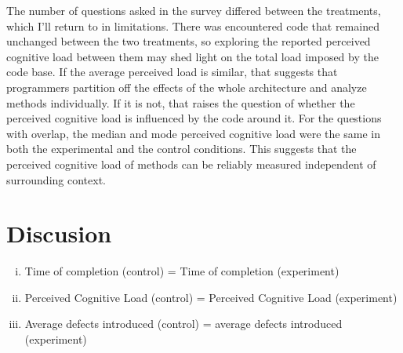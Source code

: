 The number of questions asked in the survey differed between the treatments, which I’ll return to in limitations. There was encountered code that remained unchanged between the two treatments, so exploring the reported perceived cognitive load between them may shed light on the total load imposed by the code base. If the average perceived load is similar, that suggests that programmers partition off the effects of the whole architecture and analyze methods individually. If it is not, that raises the question of whether the perceived cognitive load is influenced by the code around it. For the questions with overlap, the median and mode perceived cognitive load were the same in both the experimental and the control conditions. This suggests that the perceived cognitive load of methods can be reliably measured independent of surrounding context.

\section{Discusion}

\begin{enumerate}[i.]
	\item Time of completion (control) = Time of completion (experiment)
	\item Perceived Cognitive Load (control) = Perceived Cognitive Load (experiment)
	\item Average defects introduced (control) = average defects introduced (experiment)
\end{enumerate}


